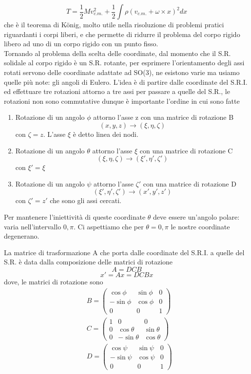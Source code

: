\documentclass[
10pt, %
a4paper, %
oneside, %
headinclude,footinclude, %
BCOR5mm, %
]{scrartcl}
\begin{document}
\[T = \frac{1}{2}Mv_{c.m.}^2 + \frac{1}{2}\int\rho(v_{c.m.}+\omega\times x)^2dx\]
che è il teorema di K\"{o}nig, molto utile nella risoluzione di problemi pratici riguardanti i corpi liberi, e che permette di ridurre il problema del corpo rigido libero ad uno di un corpo rigido con un punto fisso.\\
Tornando al problema della scelta delle coordinate, dal momento che il S.R. solidale al corpo rigido è un S.R. rotante, per esprimere l'orientamento degli assi rotati servono delle coordinate adattate ad SO(3), ne esistono varie ma usiamo quelle più note: gli angoli di Eulero. L'idea è di partire dalle coordinate del S.R.I. ed effettuare tre rotazioni attorno a tre assi per passare a quelle del S.R., le rotazioni non sono commutative dunque è importante l'ordine in cui sono fatte
 \begin{enumerate}
 	\item Rotazione di un angolo $\phi$ attorno l'asse z con una matrice di rotazione B
 	\[(x, y, z)\rightarrow (\xi, \eta, \zeta)\]
 	con \(\zeta = z\). L'asse $\xi$ è detto linea dei nodi.
 	\item Rotazione di un angolo $\theta$ attorno l'asse $\xi$ con una matrice di rotazione C
 	\[(\xi, \eta, \zeta)\rightarrow (\xi', \eta', \zeta')\]
 	con \(\xi' = \xi\)
 	\item Rotazione di un angolo $\psi$ attorno l'asse $\zeta'$ con una matrice di rotazione D
 	\[(\xi', \eta', \zeta')\rightarrow (x', y', z')\]
 	con \(\zeta' = z'\)
 	che sono gli assi cercati.
 \end{enumerate}
\begin{osservazione}
	Per mantenere l'iniettività di queste coordinate $\theta$ deve essere un'angolo polare: varia nell'intervallo \(0, \pi\). Ci aspettiamo che per $\theta = 0, \pi$ le nostre coordinate degenerano.
\end{osservazione}
La matrice di trasformazione A che porta dalle coordinate del S.R.I. a quelle del S.R. è data dalla composizione delle matrici di rotazione
\[A =  DCB\]
\[x'=Ax=DCBx\]
dove, le matrici di rotazione sono
\begin{align*}
	&B =
	\begin{pmatrix}
		\cos\phi&\sin\phi&0\\
		-\sin\phi&\cos\phi&0\\
		0&0&1
	\end{pmatrix}\\
	&C =
	\begin{pmatrix}
		1&0&0\\
		0&\cos\theta&\sin\theta\\
		0&-\sin\theta&\cos\theta
	\end{pmatrix}\\
	&D =
	\begin{pmatrix}
		\cos\psi&\sin\psi&0\\
		-\sin\psi&\cos\psi&0\\
		0&0&1
	\end{pmatrix}
\end{align*}
\end{document}
